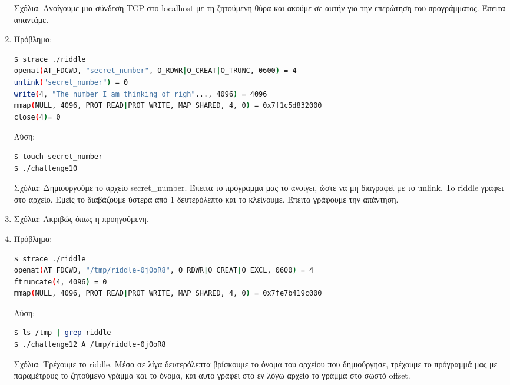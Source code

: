 \documentclass[12pt,titlepage]{article}
\newcommand{\en}{\textlatin}
\begin{document}
\begin{enumerate}
Σχόλια: Ανοίγουμε μια σύνδεση \en{TCP} στο \en{localhost} με τη ζητούμενη θύρα και ακούμε σε αυτήν για την επερώτηση του προγράμματος. Έπειτα απαντάμε.

\item

Πρόβλημα:

\latintext
\begin{lstlisting}[language=bash]
$ strace ./riddle
openat(AT_FDCWD, "secret_number", O_RDWR|O_CREAT|O_TRUNC, 0600) = 4
unlink("secret_number") = 0
write(4, "The number I am thinking of righ"..., 4096) = 4096
mmap(NULL, 4096, PROT_READ|PROT_WRITE, MAP_SHARED, 4, 0) = 0x7f1c5d832000
close(4)= 0
\end{lstlisting}
\greektext

Λύση:

\latintext
\begin{lstlisting}[language=bash]
$ touch secret_number
$ ./challenge10
\end{lstlisting}
\greektext

Σχόλια: Δημιουργούμε το αρχείο \en{secret_number}. Έπειτα το πρόγραμμα μας το ανοίγει, ώστε να μη διαγραφεί με το \en{unlink}. To \en{riddle} γράφει στο αρχείο. Εμείς το διαβάζουμε ύστερα από 1 δευτερόλεπτο και το κλείνουμε. Έπειτα γράφουμε την απάντηση.

\item

Σχόλια: Ακριβώς όπως η προηγούμενη.

\item

Πρόβλημα:

\latintext
\begin{lstlisting}[language=bash]
$ strace ./riddle
openat(AT_FDCWD, "/tmp/riddle-0j0oR8", O_RDWR|O_CREAT|O_EXCL, 0600) = 4
ftruncate(4, 4096) = 0
mmap(NULL, 4096, PROT_READ|PROT_WRITE, MAP_SHARED, 4, 0) = 0x7fe7b419c000
\end{lstlisting}
\greektext

Λύση:

\latintext
\begin{lstlisting}[language=bash]
$ ls /tmp | grep riddle
$ ./challenge12 A /tmp/riddle-0j0oR8
\end{lstlisting}
\greektext

Σχόλια: Τρέχουμε το \en{riddle}. Μέσα σε λίγα δευτερόλεπτα βρίσκουμε το όνομα του αρχείου που δημιούργησε, τρέχουμε το πρόγραμμά μας με παραμέτρους το ζητούμενο γράμμα και το όνομα, και αυτο γράφει στο εν λόγω αρχείο το γράμμα στο σωστό \en{offset}.


\end{enumerate}
\end{document}
